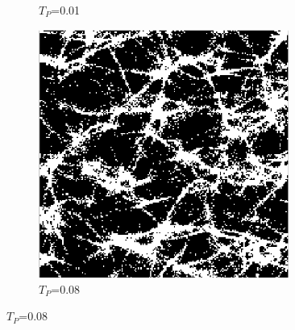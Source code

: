 \begin{figure}[!htb]
\begin{minipage}{0.5\textwidth}
\begin{subfigure}{0.5\textwidth}
    \caption{$T_P$=0.01}
    \label{bin001}
  \end{subfigure}%
  \begin{subfigure}{0.5\textwidth}
    \centering
    \includegraphics[width=0.9\textwidth]{Figures/chapter-image/binary/fig_bin_08.png}
    \caption{$T_P$=0.08}
    \label{bin008}
  \end{subfigure}


\end{minipage}
\end{figure}
